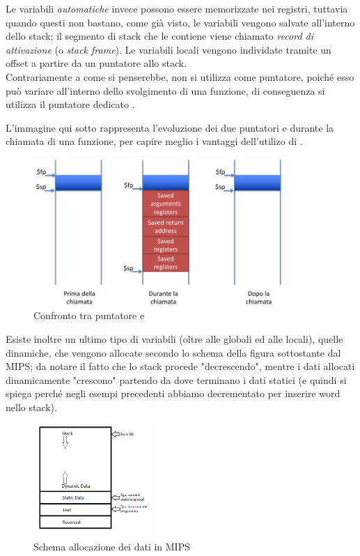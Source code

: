 \documentclass[class=book, crop=false, oneside]{standalone}
\begin{document}
Le variabili \emph{automatiche} invece possono essere memorizzate nei registri, tuttavia quando questi non bastano, come già visto, le variabili vengono salvate all'interno dello stack; il segmento di stack che le contiene viene chiamato \emph{record di attivazione} (o \emph{stack frame}). Le variabili locali vengono individate tramite un offset a partire da un puntatore allo stack.\\
Contrariamente a come si penserebbe, non si utilizza  come puntatore, poiché esso può variare all'interno dello svolgimento di una funzione, di conseguenza si utilizza il puntatore dedicato .

L'immagine qui sotto rappresenta l'evoluzione dei due puntatori  e  durante la chiamata di una funzione, per capire meglio i vantaggi dell'utilizo di .
\begin{figure}[H]
	\centering
	\includegraphics[width=0.85\textwidth,keepaspectratio]{sp-vs-fp}
	\caption{Confronto tra puntatore  e }
\end{figure}

Esiste inoltre un ultimo tipo di variabili (oltre alle globali ed alle locali), quelle dinamiche, che vengono allocate secondo lo schema della figura sottostante dal MIPS; da notare il fatto che lo stack procede "decrescendo", mentre i dati allocati dinamicamente "crescono"  partendo da dove terminano i dati statici (e quindi si spiega perché negli esempi precedenti abbiamo decrementato  per inserire word nello stack).
\begin{figure}[H]
	\centering
	\includegraphics[width=0.4\textwidth,keepaspectratio]{Dove-finiscono-le-variabili}
	\caption{Schema allocazione dei dati in MIPS}
\end{figure}
\end{document}

